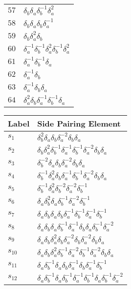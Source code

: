 \documentclass{article}
\begin{document}
\begin{center}
\begin{tabular}{ll}
$57$ & $\delta_b^{}\delta_a^{}\delta_b^{-1}\delta_a^{2}$ \\
$58$ & $\delta_b^{}\delta_a^{}\delta_b^{}\delta_a^{-1}$ \\
$59$ & $\delta_b^{}\delta_a^{2}\delta_b^{}$ \\
$60$ & $\delta_a^{-1}\delta_b^{-1}\delta_a^{2}\delta_b^{-1}\delta_a^{2}$ \\
$61$ & $\delta_a^{-1}\delta_b^{-1}\delta_a^{}$ \\
$62$ & $\delta_a^{-1}\delta_b^{}$ \\
$63$ & $\delta_a^{-1}\delta_b^{}\delta_a^{}$ \\
$64$ & $\delta_a^{2}\delta_b^{}\delta_a^{-1}\delta_b^{-1}\delta_a^{}$ \\
\bottomrule
\end{tabular}
\hfill
\begin{tabular}{ll}
\toprule
Label & Side Pairing Element\\
\midrule
$s_{1}$ & $\delta_b^{2}\delta_a^{}\delta_b^{}\delta_a^{-2}\delta_b^{}\delta_a^{}$ \\
$s_{2}$ & $\delta_b^{}\delta_a^{2}\delta_b^{-1}\delta_a^{-1}\delta_b^{-1}\delta_a^{-2}\delta_b^{}\delta_a^{}$ \\
$s_{3}$ & $\delta_b^{-2}\delta_a^{}\delta_b^{}\delta_a^{-2}\delta_b^{}\delta_a^{}$ \\
$s_{4}$ & $\delta_b^{-1}\delta_a^{2}\delta_b^{}\delta_a^{-1}\delta_b^{-1}\delta_a^{-2}\delta_b^{}\delta_a^{}$ \\
$s_{5}$ & $\delta_b^{-1}\delta_a^{2}\delta_b^{-2}\delta_a^{-2}\delta_b^{-1}$ \\
$s_{6}$ & $\delta_a^{}\delta_b^{2}\delta_a^{}\delta_b^{-1}\delta_a^{-2}\delta_b^{-1}$ \\
$s_{7}$ & $\delta_a^{}\delta_b^{}\delta_a^{}\delta_b^{}\delta_a^{-1}\delta_b^{-1}\delta_a^{-1}\delta_b^{-1}$ \\
$s_{8}$ & $\delta_a^{}\delta_b^{}\delta_a^{}\delta_b^{-1}\delta_a^{-1}\delta_b^{}\delta_a^{}\delta_b^{-1}\delta_a^{-2}$ \\
$s_{9}$ & $\delta_a^{}\delta_b^{}\delta_a^{2}\delta_b^{}\delta_a^{-2}\delta_b^{}\delta_a^{-2}\delta_b^{}\delta_a^{}$ \\
$s_{10}$ & $\delta_a^{}\delta_b^{}\delta_a^{2}\delta_b^{-1}\delta_a^{-2}\delta_b^{-1}\delta_a^{-2}\delta_b^{}\delta_a^{}$ \\
$s_{11}$ & $\delta_a^{}\delta_b^{-1}\delta_a^{}\delta_b^{}\delta_a^{-1}\delta_b^{}\delta_a^{-1}\delta_b^{-1}$ \\
$s_{12}$ & $\delta_a^{}\delta_b^{-1}\delta_a^{}\delta_b^{-1}\delta_a^{-1}\delta_b^{-1}\delta_a^{}\delta_b^{-1}\delta_a^{-2}$ \\

\end{tabular}
\end{center}
\end{document}
